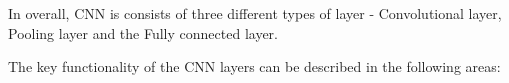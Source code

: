 In overall, CNN is consists of three different types of layer - Convolutional layer, Pooling layer and the Fully connected layer. 




\begin{figure}
\centering
{}
\end{figure}


The key functionality of the CNN layers can be described in the following areas: 

